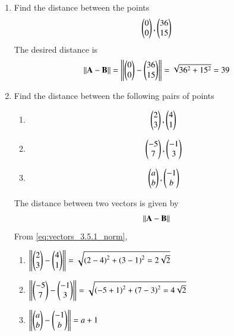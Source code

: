 \renewcommand{\theequation}{\theenumi}
\begin{enumerate}[label=\thesubsection.\arabic*.,ref=\thesubsection.\theenumi]

\item Find the distance between the points 
\begin{align}
\begin{pmatrix}0\\0\end{pmatrix}, \begin{pmatrix}36\\15\end{pmatrix}
\end{align}
%
\solution The desired distance is 
\begin{align}
\left\lVert\mathbf{A} - \mathbf{B}\right\rVert 
=\left\lVert\begin{pmatrix}0\\0\end{pmatrix} - \begin{pmatrix}36\\15\end{pmatrix}\right\rVert = \sqrt{36^2+15^2} = 39
\end{align}

\item Find the distance between the following pairs of points
\begin{enumerate}
\item 
\begin{align}
\begin{pmatrix}2\\3\end{pmatrix}, \begin{pmatrix}4\\1\end{pmatrix}
\end{align}
\item 
\begin{align}
\begin{pmatrix}-5\\7\end{pmatrix}, \begin{pmatrix}-1\\3\end{pmatrix}
\end{align}
\item 
\begin{align}
\begin{pmatrix}a\\b\end{pmatrix}, \begin{pmatrix}-1\\b\end{pmatrix}
\end{align}
\end{enumerate}
\solution The distance between two vectors is given by 
\begin{align}
\left\lVert\mathbf{A}-\mathbf{B}\right\rVert
\label{eq:vectors_3.5.1_norm}
\end{align}
From \eqref{eq:vectors_3.5.1_norm},
\begin{enumerate}
\item 
$\left\lVert\begin{pmatrix}2\\3\end{pmatrix}-\begin{pmatrix}4\\1\end{pmatrix}\right\rVert=\sqrt{\left(2-4\right)^2+\left(3-1\right)^2 = 2\sqrt{2}}$
\item $\left\lVert\begin{pmatrix}-5\\7\end{pmatrix}-\begin{pmatrix}-1\\3\end{pmatrix}\right\rVert=\sqrt{\left(-5+1\right)^2+\left(7-3\right)^2 = 4\sqrt{2}}$
\item $\left\lVert\begin{pmatrix}a\\b\end{pmatrix}-\begin{pmatrix}-1\\b\end{pmatrix}\right\rVert=a+1$


\end{enumerate}
\end{enumerate}
